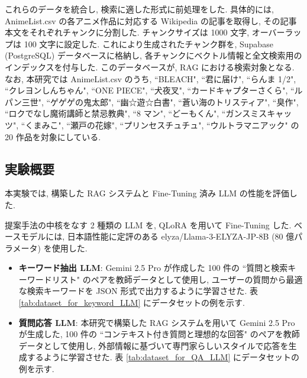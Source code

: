 \documentclass{jarticle}
\begin{document}
これらのデータを統合し, 検索に適した形式に前処理をした. 具体的には, AnimeList.csv の各アニメ作品に対応する Wikipedia の記事を取得し, その記事本文をそれぞれチャンクに分割した. チャンクサイズは 1000 文字, オーバーラップは 100 文字に設定した. これにより生成されたチャンク群を, Supabase (PostgreSQL) データベースに格納し, 各チャンクにベクトル情報と全文検索用のインデックスを付与した. このデータベースが, RAG における検索対象となる. なお, 本研究では AnimeList.csv のうち, ``BLEACH", ``君に届け", ``らんま 1/2", ``クレヨンしんちゃん", ``ONE PIECE", ``犬夜叉", ``カードキャプターさくら", ``ルパン三世", ``ゲゲゲの鬼太郎", ``幽☆遊☆白書", ``蒼い海のトリスティア", ``臭作", ``ロクでなし魔術講師と禁忌教典", ``8 マン", ``どーもくん", ``ガンスミスキャッツ", ``くまみこ", ``瀬戸の花嫁", ``プリンセスチュチュ", ``ウルトラマニアック" の 20 作品を対象にしている. 

\vspace{-3mm}
\subsection{実験概要}
\vspace{-1mm}

本実験では, 構築した RAG システムと Fine-Tuning 済み LLM の性能を評価した. \par

提案手法の中核をなす 2 種類の LLM を, QLoRA を用いて Fine-Tuning した. ベースモデルには, 日本語性能に定評のある elyza/Llama-3-ELYZA-JP-8B (80 億パラメータ) \cite{Llama-3-ELYZA-JP-8B} を使用した.

\begin{itemize}
\item \textbf{キーワード抽出 LLM}: Gemini 2.5 Pro が作成した 100 件の ``質問と検索キーワードリスト" のペアを教師データとして使用し, ユーザーの質問から最適な検索キーワードを JSON 形式で出力するように学習させた. 表 \ref{tab:dataset_for_keyword_LLM} にデータセットの例を示す. 
\item \textbf{質問応答 LLM}: 本研究で構築した RAG システムを用いて Gemini 2.5 Pro が生成した, 100 件の ``コンテキスト付き質問と理想的な回答" のペアを教師データとして使用し, 外部情報に基づいて専門家らしいスタイルで応答を生成するように学習させた. 表 \ref{tab:dataset_for_QA_LLM} にデータセットの例を示す. 
\end{itemize}
\end{document}
